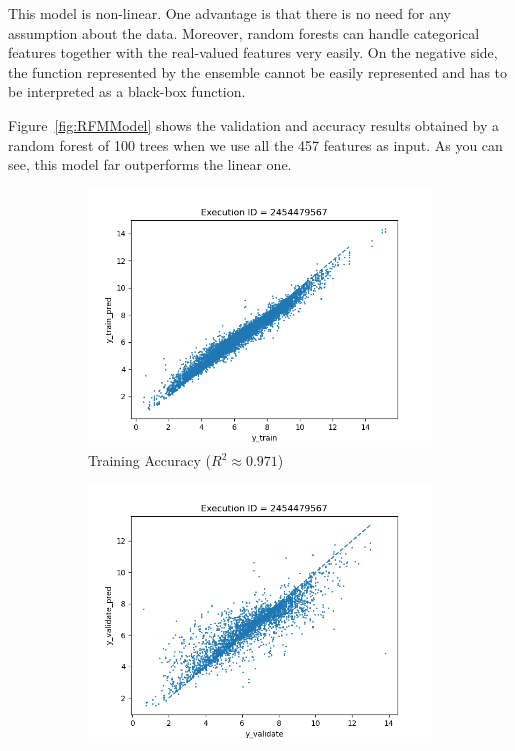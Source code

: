 \documentclass[11pt]{article}
\begin{document}
This model is non-linear.
One advantage is that there is no need for any assumption about the data.
Moreover,  random forests can handle categorical features together with the real-valued features very easily.
On the negative side,  the function represented by the ensemble cannot be easily represented and has to be interpreted as a black-box function.

Figure~\ref{fig:RFMModel} shows the validation and accuracy results obtained by a random forest of 100 trees when we use all the 457 features as input.
As you can see,  this model far outperforms the linear one.


\begin{figure}
     \centering
     \begin{subfigure}[b]{0.45\textwidth}
         \centering
         \includegraphics[scale=0.45]{images/accuracy_train_rfr}
         \caption{Training Accuracy ($R^2 \approx 0.971$)}
        \label{fig:TrainingAccuracyRFM}
     \end{subfigure}
     \hfill
     \begin{subfigure}[b]{0.45\textwidth}
         \centering
         \includegraphics[scale=0.45]{images/accuracy_validate_rfr}

\end{subfigure}
\end{figure}
\end{document}
